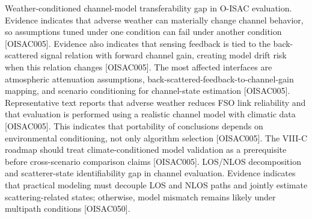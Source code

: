 {}\markdownRendererOlBegin
{} Weather-conditioned channel-model transferability gap in O-ISAC evaluation.\markdownRendererOlItemEnd 
{} Evidence indicates that adverse weather can materially change channel behavior, so assumptions tuned under one condition can fail under another condition [O\markdownRendererUnderscore{}ISAC\markdownRendererUnderscore{}005]. Evidence also indicates that sensing feedback is tied to the back-scattered signal relation with forward channel gain, creating model drift risk when this relation changes [O\markdownRendererUnderscore{}ISAC\markdownRendererUnderscore{}005].\markdownRendererOlItemEnd 
{} The most affected interfaces are atmospheric attenuation assumptions, back-scattered-feedback-to-channel-gain mapping, and scenario conditioning for channel-state estimation [O\markdownRendererUnderscore{}ISAC\markdownRendererUnderscore{}005].\markdownRendererOlItemEnd 
{} Representative text reports that adverse weather reduces FSO link reliability and that evaluation is performed using a realistic channel model with climatic data [O\markdownRendererUnderscore{}ISAC\markdownRendererUnderscore{}005]. This indicates that portability of conclusions depends on environmental conditioning, not only algorithm selection [O\markdownRendererUnderscore{}ISAC\markdownRendererUnderscore{}005].\markdownRendererOlItemEnd 
{} The VIII-C roadmap should treat climate-conditioned model validation as a prerequisite before cross-scenario comparison claims [O\markdownRendererUnderscore{}ISAC\markdownRendererUnderscore{}005].\markdownRendererOlItemEnd 
\markdownRendererOlEnd \markdownRendererInterblockSeparator
{}
\markdownRendererSectionEnd \markdownRendererSectionBegin
{}\markdownRendererInterblockSeparator
{}\markdownRendererOlBegin
{} LOS/NLOS decomposition and scatterer-state identifiability gap in channel evaluation.\markdownRendererOlItemEnd 
{} Evidence indicates that practical modeling must decouple LOS and NLOS paths and jointly estimate scattering-related states; otherwise, model mismatch remains likely under multipath conditions [O\markdownRendererUnderscore{}ISAC\markdownRendererUnderscore{}050].\markdownRendererOlItemEnd 
